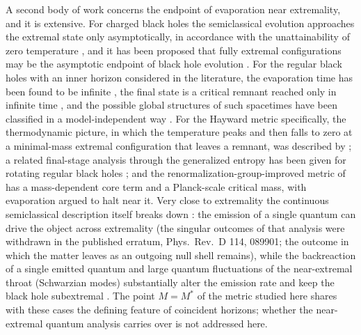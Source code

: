\documentclass[11pt]{article}
\begin{document}
A second body of work concerns the endpoint of evaporation near extremality, and it is extensive. For charged black holes the semiclassical evolution approaches the extremal state only asymptotically, in accordance with the unattainability of zero temperature \citep{SorkinPiran2001}, and it has been proposed that fully extremal configurations may be the asymptotic endpoint of black hole evolution \citep{DiFilippo2024}. For the regular black holes with an inner horizon considered in the literature, the evaporation time has been found to be infinite \citep{CarballoRubio2018}, the final state is a critical remnant reached only in infinite time \citep{Bonanno2023}, and the possible global structures of such spacetimes have been classified in a model-independent way \citep{SuetoYoshino2025}. For the Hayward metric specifically, the thermodynamic picture, in which the temperature peaks and then falls to zero at a minimal-mass extremal configuration that leaves a remnant, was described by \citet{MehdipourAhmadi2016}; a related final-stage analysis through the generalized entropy has been given for rotating regular black holes \citep{Takeuchi2026}; and the renormalization-group-improved metric of \citet{BonannoReuter2000} has a mass-dependent core term and a Planck-scale critical mass, with evaporation argued to halt near it. Very close to extremality the continuous semiclassical description itself breaks down \citep{Preskill1991}: the emission of a single quantum can drive the object across extremality \citep{Gralla2026} (the singular outcomes of that analysis were withdrawn in the published erratum, Phys.\ Rev.\ D 114, 089901; the outcome in which the matter leaves as an outgoing null shell remains), while the backreaction of a single emitted quantum and large quantum fluctuations of the near-extremal throat (Schwarzian modes) substantially alter the emission rate and keep the black hole subextremal \citep{Brown2026}. The point $M=M^*$ of the metric studied here shares with these cases the defining feature of coincident horizons; whether the near-extremal quantum analysis carries over is not addressed here.
\end{document}
